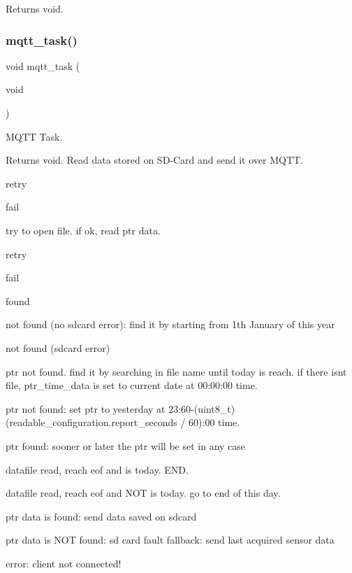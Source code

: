 \begin{DoxyReturn}{Returns}
void. 
\end{DoxyReturn}
\mbox{\label{rmap_8ino_a161bca6629368a46242fec07a965966a}} 
\subsubsection{\texorpdfstring{mqtt\+\_\+task()}{mqtt\_task()}}
{\footnotesize\ttfamily void mqtt\+\_\+task (\begin{DoxyParamCaption}\item[{void}]{ }\end{DoxyParamCaption})}



M\+Q\+TT Task. 

\begin{DoxyReturn}{Returns}
void. Read data stored on S\+D-\/\+Card and send it over M\+Q\+TT. 
\end{DoxyReturn}
retry

fail

try to open file. if ok, read ptr data.

retry

fail

found

not found (no sdcard error)\+: find it by starting from 1th January of this year

not found (sdcard error)

ptr not found. find it by searching in file name until today is reach. if there isn\textquotesingle{}t file, ptr\+\_\+time\+\_\+data is set to current date at 00\+:00\+:00 time.

ptr not found\+: set ptr to yesterday at 23\+:60-\/(uint8\+\_\+t)(readable\+\_\+configuration.\+report\+\_\+seconds / 60)\+:00 time.

ptr found\+: sooner or later the ptr will be set in any case

datafile read, reach eof and is today. E\+ND.

datafile read, reach eof and N\+OT is today. go to end of this day.

ptr data is found\+: send data saved on sdcard

ptr data is N\+OT found\+: sd card fault fallback\+: send last acquired sensor data

error\+: client not connected!

